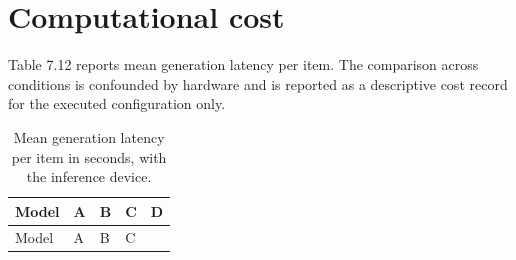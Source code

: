 \section{Computational cost}

Table 7.12 reports mean generation latency per item. The comparison across conditions is confounded by hardware and is reported as a descriptive cost record for the executed configuration only.

\begin{landscape}
\begingroup\scriptsize\setlength{\tabcolsep}{3pt}\sloppy
\begin{longtable}[]{@{}
  >{\raggedright\arraybackslash}p{}
  >{\raggedright\arraybackslash}p{}
  >{\raggedright\arraybackslash}p{}
  >{\raggedright\arraybackslash}p{}
  >{\raggedright\arraybackslash}p{}@{}}
\caption{Mean generation latency per item in seconds, with the inference device.}\tabularnewline
\toprule\noalign{}
\begin{minipage}[b]{\linewidth}\raggedright
Model
\end{minipage} & \begin{minipage}[b]{\linewidth}\raggedright
A
\end{minipage} & \begin{minipage}[b]{\linewidth}\raggedright
B
\end{minipage} & \begin{minipage}[b]{\linewidth}\raggedright
C
\end{minipage} & \begin{minipage}[b]{\linewidth}\raggedright
D
\end{minipage} \\
\midrule\noalign{}
\endfirsthead
\toprule\noalign{}
\begin{minipage}[b]{\linewidth}\raggedright
Model
\end{minipage} & \begin{minipage}[b]{\linewidth}\raggedright
A
\end{minipage} & \begin{minipage}[b]{\linewidth}\raggedright
B
\end{minipage} & \begin{minipage}[b]{\linewidth}\raggedright
C
\end{minipage} & \begin{minipage}[b]{\linewidth}\raggedright

\end{minipage}
\end{longtable}
\end{landscape}
